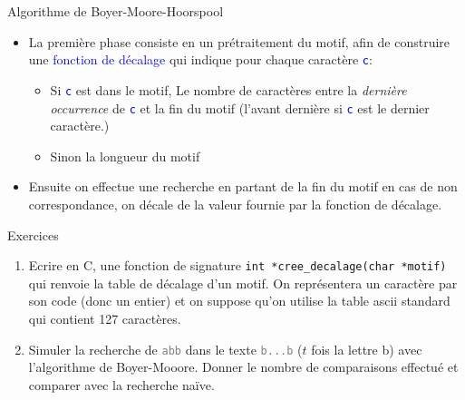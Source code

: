 \documentclass[10pt]{beamer}
\begin{document}
\begin{frame}{\Ctitle}{\stitle}
	\begin{block}{Algorithme de Boyer-Moore-Hoorspool}
		\begin{itemize}
		\item<1-> La première phase consiste en un prétraitement du motif, afin de construire une \textcolor{blue}{fonction de décalage} qui indique pour chaque caractère \textcolor{blue}{\tt c}:
		\begin{itemize}
			\item<2-> Si \textcolor{blue}{\tt c} est dans le motif, Le nombre de caractères entre la \textit{dernière occurrence} de \textcolor{blue}{\tt c} et la fin du motif (l'avant dernière si \textcolor{blue}{\tt c} est le dernier caractère.)
			\item<3-> Sinon la longueur du motif
		\end{itemize}
		\item<4-> Ensuite on effectue une recherche en partant de la fin du motif en cas de non correspondance, on décale de la valeur fournie par la fonction de décalage.
	\end{itemize}
	\end{block}
\end{frame}

\begin{frame}{\Ctitle}{\stitle}
	\begin{exampleblock}{Exercices}
		\begin{enumerate}
		\item Ecrire en C, une fonction de signature \texttt{int *cree_decalage(char *motif)} qui renvoie la table de décalage d'un motif. On représentera un caractère par son code (donc un entier) et on suppose qu'on utilise la table {\sc ascii} standard qui contient 127 caractères. 
		\item Simuler la recherche de \textcolor{gray}{\tt abb} dans le texte \textcolor{gray}{\tt b...b} ($t$ fois la lettre b) avec l'algorithme de Boyer-Mooore. Donner le nombre de comparaisons effectué et comparer avec la recherche naïve.
		\end{enumerate}
	\end{exampleblock}
\end{frame}
\end{document}
